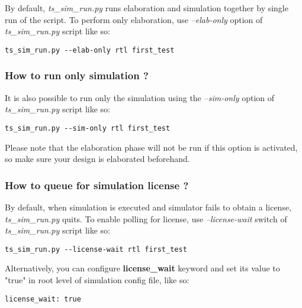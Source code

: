 \documentclass{tropic_design_spec}
\begin{document}
By default, \textit{ts_sim_run.py} runs elaboration and simulation together by single
run of the script. To perform only elaboration, use \textit{--elab-only} option of
\textit{ts_sim_run.py} script like so:

\begin{lstlisting}
ts_sim_run.py --elab-only rtl first_test
\end{lstlisting}


\subsubsection{How to run only simulation ?}
\label{sec:how-to-run-only-simulation}

It is also possible to run only the simulation using the \textit{--sim-only} option of
\textit{ts_sim_run.py} script like so:

\begin{lstlisting}
ts_sim_run.py --sim-only rtl first_test
\end{lstlisting}

Please note that the elaboration phase will not be run if this option is activated, so
make sure your design is elaborated beforehand.


\subsubsection{How to queue for simulation license ?}
\label{sec:how-to-queue-for-simulation-license}

By default, when simulation is executed and simulator fails to obtain a license,
\textit{ts_sim_run.py} quits. To enable polling for license, use \textit{--license-wait}
switch of \textit{ts_sim_run.py} script like so:

\begin{lstlisting}
ts_sim_run.py --license-wait rtl first_test
\end{lstlisting}

Alternatively, you can configure \textbf{license_wait} keyword and set its value to
"true" in root level of simulation config file, like so:

\begin{lstlisting}
license_wait: true
\end{lstlisting}
\end{document}
